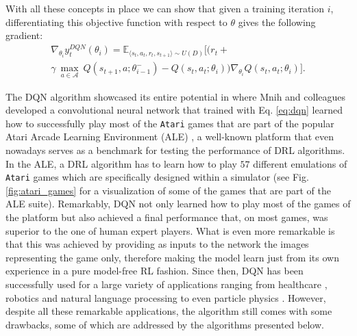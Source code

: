 With all these concepts in place we can show that given a training iteration $i$, differentiating this objective function with respect to $\theta$ gives the following gradient: 
\begin{multline}
\nabla_{\theta_{i}}y^{DQN}_{t}(\theta_{i}) = \mathds{E}_{\langle s_{t},a_{t},r_{t},s_{t+1}\rangle\sim U(D)} \bigg[\big(r_{t} + \\ \gamma \: \underset{a\in \mathcal{A}}{\max}\: Q(s_{t+1}, a; \theta^{-}_{i-1})  - Q(s_{t}, a_{t}; \theta_{i})\big)\nabla_{\theta_{i}} Q(s_{t}, a_{t}; \theta_{i})\bigg].
\label{eq:dqn_gradient}
\end{multline}

The DQN algorithm showcased its entire potential in \cite{mnih2015human} where Mnih and colleagues developed a convolutional neural network that trained with Eq. \ref{eq:dqn} learned how to successfully play most of the \texttt{Atari} games that are part of the popular Atari Arcade Learning Environment (ALE) \cite{bellemare2013arcade}, a well-known platform that even nowadays serves as a benchmark for testing the performance of DRL algorithms. In the ALE, a DRL algorithm has to learn how to play $57$ different emulations of \texttt{Atari} games which are specifically designed within a simulator (see Fig. \ref{fig:atari_games} for a visualization of some of the games that are part of the ALE suite). Remarkably, DQN not only learned how to play most of the games of the platform but also achieved a final performance that, on most games, was superior to the one of human expert players. What is even more remarkable is that this was achieved by providing as inputs to the network the images representing the game only, therefore making the model learn just from its own experience in a pure model-free RL fashion. Since then, DQN has been successfully used for a large variety of applications ranging from healthcare \cite{tseng2017deep,raghu2017continuous}, robotics \cite{kalashnikov2018qt} and natural language processing \cite{he2015deep, narasimhan2015language} to even particle physics \cite{liu2017learning, sajedian2020design}. However, despite all these remarkable applications, the algorithm still comes with some drawbacks, some of which are addressed by the algorithms presented below.

